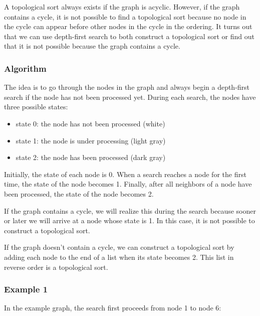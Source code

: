 A topological sort always exists
if the graph is acyclic.
However, if the graph contains a cycle,
it is not possible to find a topological sort
because no node in the cycle can appear
before other nodes in the cycle in the ordering.
It turns out that we can use depth-first search
to both construct a topological sort or find out
that it is not possible because the graph contains a cycle.

\subsubsection{Algorithm}

The idea is to go through the nodes in the graph
and always begin a depth-first search if the
node has not been processed yet.
During each search, the nodes have three possible states:

\begin{itemize}
\item state 0: the node has not been processed (white)
\item state 1: the node is under processing (light gray)
\item state 2: the node has been processed (dark gray)
\end{itemize}

Initially, the state of each node is 0.
When a search reaches a node for the first time,
the state of the node becomes 1.
Finally, after all neighbors of a node have
been processed, the state of the node becomes 2.

If the graph contains a cycle, we will realize this
during the search because sooner or later
we will arrive at a node whose state is 1.
In this case, it is not possible to construct a topological sort.

If the graph doesn't contain a cycle, we can construct
a topological sort by adding each node to the end of a list
when its state becomes 2.
This list in reverse order is a topological sort.

\subsubsection{Example 1}

In the example graph, the search first proceeds
from node 1 to node 6:

